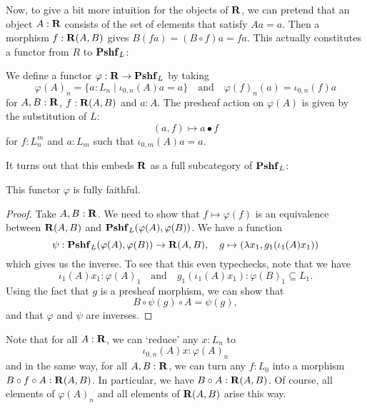 Now, to give a bit more intuition for the objects of $ \mathbf{R} $, we can pretend that an object $ A : \mathbf{R} $ consists of the set of elements that satisfy $ A a = a $. Then a morphism $ f : \mathbf{R}(A, B) $ gives $ B (f a) = (B \circ f) a = f a $. This actually constitutes a functor from $ R $ to $ \mathbf{Pshf}_{L} $:

\begin{definition}\label{def:retracts-embedding}
  We define a functor $ \varphi: \mathbf{R} \to \mathbf{Pshf}_{L} $ by taking
  \[ \varphi(A)_n = \{ a : L_n \mid \iota_{0, n}(A) a = a \} \quad \text{and} \quad \varphi(f)_n(a) = \iota_{0, n}(f) a \]
  for $ A, B : \mathbf{R} $, $ f: \mathbf{R}(A, B) $ and $ a : A $. The presheaf action on $ \varphi(A) $ is given by the substitution of $ L $:
  \[ (a, f) \mapsto a \bullet f \]
  for $ f : L_n^m $ and $ a : L_m $ such that $ \iota_{0, m}(A) a = a $.
\end{definition}

It turns out that this embeds $ \mathbf{R} $ as a full subcategory of $ \mathbf{Pshf}_{L} $:
\begin{lemma}
  This functor $ \varphi $ is fully faithful.
\end{lemma}
\begin{proof}
  Take $ A, B : \mathbf{R} $. We need to show that $ f \mapsto \varphi(f) $ is an equivalence between $ \mathbf{R}(A, B) $ and $ \mathbf{Pshf}_{L}(\varphi(A), \varphi(B)) $. We have a function
  \[ \psi: \mathbf{Pshf}_{L}(\varphi(A), \varphi(B)) \to \mathbf{R}(A, B), \quad g \mapsto (\lambda x_1, g_1(\iota_1(A) x_1)) \]
  which gives us the inverse. To see that this even typechecks, note that we have
  \[ \iota_1(A) x_1 : \varphi(A)_1 \quad \text{and} \quad g_1(\iota_1(A) x_1) : \varphi(B)_1 \subseteq L_1. \]
  Using the fact that $ g $ is a presheaf morphism, we can show that
  \[ B \circ \psi(g) \circ A = \psi(g), \]
  and that $ \varphi $ and $ \psi $ are inverses.
\end{proof}

\begin{remark}
  Note that for all $ A : \mathbf{R} $, we can `reduce' any $ x: L_n $ to
  \[ \iota_{0, n}(A) x : \varphi(A)_n \]
  and in the same way, for all $ A, B: \mathbf{R} $, we can turn any $ f: L_0 $ into a morphism $ B \circ f \circ A : \mathbf{R}(A, B) $. In particular, we have $ B \circ A : \mathbf{R}(A, B) $.
  Of course, all elements of $ \varphi(A)_n $ and all elements of $ \mathbf{R}(A, B) $ arise this way.
\end{remark}

